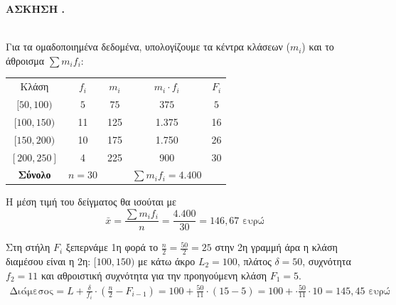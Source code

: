 \documentclass[11pt,a4paper]{article}
\newcommand{\kerkissans}[1]{{\fontfamily{maksf}\selectfont \textbf{#1}}}
\newcounter{askhsh}
\newcommand{\askhsh}{\kerkissans{\Large{ΑΣΚΗΣΗ \theaskhsh.\\}}\ \addtocounter{askhsh}{1}}
\begin{document}
\askhsh\vspace{-5mm}
\begin{Alist}
\item 
Για τα ομαδοποιημένα δεδομένα, υπολογίζουμε τα κέντρα κλάσεων ($m_i$) και το άθροισμα $\sum m_i f_i$:
\begin{center}
\begin{tabular}{|c|c|c|c|c|}
\hline
Κλάση & $f_i$ & $m_i$ & $m_i \cdot f_i$ & $F_i$\\
\hhline{=====} $[50, 100)$ & $5$ & $75$ & $375$ & $5$ \\
$[100, 150)$ & 11 & 125 & 1.375 & 16 \\
$[150, 200)$ & 10 & 175 & 1.750 & 26 \\
$[200, 250]$ & 4 & 225 & 900 & 30 \\
\hline
\textbf{Σύνολο} & $n=30$ & & $\sum m_i f_i = 4.400$ & \\
\hline
\end{tabular}
\end{center}
\begin{rlist}
\item Η μέση τιμή του δείγματος θα ισούται με
\[\bar{x} = \frac{\sum m_i f_i}{n} = \frac{4.400}{30}= 146,67 \text{ ευρώ}\]
\item Στη στήλη $F_i$ ξεπερνάμε 1η φορά το $\frac{n}{2}=\frac{50}{2}=25$ στην 2η γραμμή άρα η κλάση διαμέσου είναι η 2η: $[100, 150)$ με κάτω άκρο $L_2=100$, πλάτος $\delta=50$, συχνότητα $f_2=11$ και αθροιστική συχνότητα για την προηγούμενη κλάση $F_{1}=5$.
\begin{gather*}
\text{Διάμεσος} = L + \frac{\delta}{f_i} \cdot \left(\frac{n}{2} - F_{i-1}\right)= 100 + \frac{50}{11} \cdot \left(15-5\right) = 100 + \cdot \frac{50}{11}\cdot 10 = 145,45 \text{ ευρώ}
\end{gather*}


\end{rlist}
\end{Alist}
\end{document}
